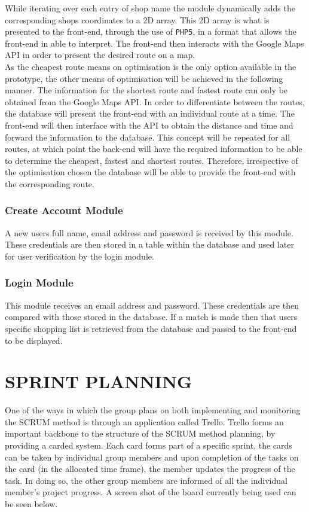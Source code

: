 \documentclass[10pt,twocolumn]{witseiepaper}
\begin{document}
		While iterating over each entry of shop name the module dynamically adds the corresponding shops coordinates to a 2D array. This 2D array is what is presented to the front-end, through the use of \texttt{PHP5}, in a format that allows the front-end in able to interpret. The front-end then interacts with the Google Maps API in order to present the desired route on a map.\\
		
		As the cheapest route means on optimisation is the only option available in the prototype, the other means of optimisation will be achieved in the following manner. The information for the shortest route and fastest route can only be obtained from the Google Maps API. In order to differentiate between the routes, the database will present the front-end with an individual route at a time. The front-end will then interface with the API to obtain the distance and time and forward the information to the database. This concept will be repeated for all routes, at which point the back-end will have the required information to be able to determine the cheapest, fastest and shortest routes. Therefore, irrespective of the optimisation chosen the database will be able to provide the front-end with the corresponding route.
		
		\subsubsection{Create Account Module}
		
		A new users full name, email address and password is received by this module. These credentials are then stored in a table within the database and used later for user verification by the login module.
		
		\subsubsection{Login Module}
		
		This module receives an email address and password. These credentials are then compared with those stored in the database. If a match is made then that users specific shopping list is retrieved from the database and passed to the front-end to be displayed.
		

\section{SPRINT PLANNING}

	One of the ways in which the group plans on both implementing and monitoring the SCRUM method is through an application called Trello. Trello forms an important backbone to the structure of the SCRUM method planning, by providing a carded system. Each card forms part of a specific sprint, the cards can be taken by individual group members and upon completion of the tasks on the card (in the allocated time frame), the member updates the progress of the task. In doing so, the other group members are informed of all the individual member's project progress. A screen shot of the board currently being used can be seen below. 
	
\end{document}
